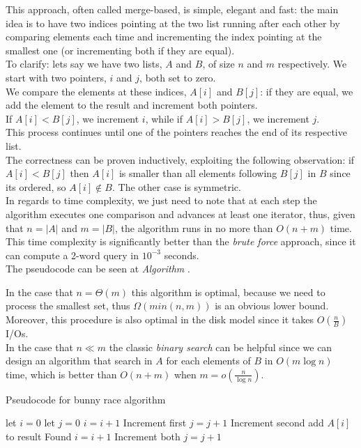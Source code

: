 This approach, often called merge-based, is simple, elegant and fast: the main idea is to have two indices pointing at the two list running after each other by comparing elements each time and incrementing the index pointing at the smallest one (or incrementing both if they are equal).\\ 
To clarify: lets say we have two lists, $A$ and $B$, of size $n$ and $m$ respectively. We start with two pointers, $i$ and $j$, both set to zero. \\
We compare the elements at these indices, $A[i]$ and $B[j]$: if they are equal, we add the element to the result and increment both pointers. \\
If $A[i] < B[j]$, we increment $i$, while if $A[i] > B[j]$, we increment $j$. \\
This process continues until one of the pointers reaches the end of its respective list.\\
The correctness can be proven inductively, exploiting the following observation: if $A[i] < B[j]$ then $A[i]$ is smaller than all elements following $B[j]$ in $B$ since its ordered, so $A[i] \notin B$. The other case is symmetric. \\
In regards to time complexity, we just need to note that at each step the algorithm executes one comparison and advances at least one iterator, thus, given that $n=|A|$ and $m=|B|$, the algorithm runs in no more than $O(n+m)$ time.\\
This time complexity is significantly better than the \textit{brute force}  approach, since it can compute a 2-word query in $10^{-3}$ seconds. \\
The pseudocode can be seen at \textit{Algorithm} .

In the case that $n=\Theta (m)$ this algorithm is optimal, because we need to process the smallest set, thus $\Omega(min(n,m))$ is an obvious lower bound. Moreover, this procedure is also optimal in the disk model since it takes $O \left(\frac{n}{B}\right)$ I/Os. \\
In the case that $n \ll m$ the classic \textit{binary search} can be helpful since we can design an algorithm that search in $A$ for each elements of $B$ in $O(m \log n)$ time, which is better than $O(n+m)$ when $m=o\left(\frac{n}{\log n}\right)$.

\begin{algorithm}
    \captionsetup{labelsep=newline}
    \caption{Pseudocode for bunny race algorithm \label{alg:bunnyrace}}
    \begin{algorithmic}[1]
        \State let $i=0$ 
        \State let $j=0$ 
                \State $i=i+1$ \Comment Increment first
                \State $j=j+1$ \Comment Increment second
            \Else
                \State add $A[i]$ to result \Comment Found
                \State $i=i+1$  \Comment Increment both
                \State $j=j+1$
            \EndIf
        \EndWhile
    \end{algorithmic}
\end{algorithm}


